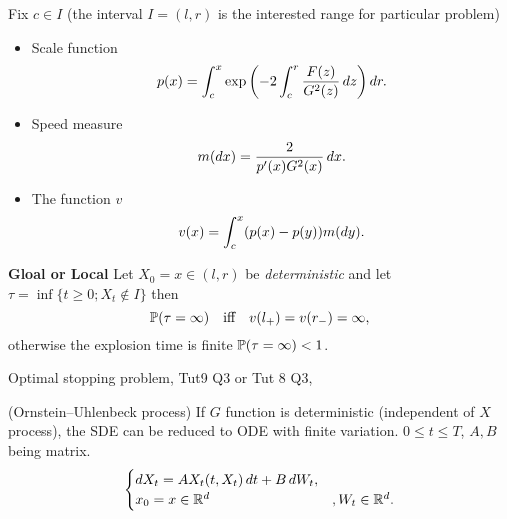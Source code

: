 \noindent Fix $c\in I$ (the interval $I = (l, r)$ is the interested range for particular problem)
\begin{itemize}
    \item Scale function
        \begin{equation*}
            p(x) = \int_c^x \exp\left(-2 \int_c^r \frac{F(z)}{G^2(z)} \mathop{}\!d z \right) \mathop{}\!d r.
        \end{equation*}
    \item Speed measure
        \begin{equation*}
            m(\mathop{}\!d x) = \frac{2}{p'(x) G^2(x)} \mathop{}\!d x.
        \end{equation*}
    \item The function $v$
        \begin{equation*}
            v(x) = \int_c^x (p(x)- p(y)) m(\mathop{}\!d y).
        \end{equation*}
\end{itemize}

\noindent \textbf{Gloal or Local}
Let $X_0 = x \in (l ,r)$ be \textit{deterministic} and let $\tau = \inf\{t\geq 0; X_t \notin I\}$ then \begin{equation*}
    \mathbb{P}(\tau = \infty) \quad \text{iff} \quad v (l_+) = v(r_-) = \infty,
\end{equation*} otherwise the explosion time is finite $\mathbb{P}(\tau = \infty) < 1$.

\newpage 
Optimal stopping problem, Tut9 Q3 or Tut 8 Q3, 



(Ornstein–Uhlenbeck process)
If $G$ function is deterministic (independent of $X$ process), the SDE can be reduced to ODE with finite variation. $0\leq t\leq T$, $A,B$ being matrix.
\begin{equation*}
    \begin{cases}
    \mathop{}\!d X_t = A X_t(t,X_t) \mathop{}\!d t + B \mathop{}\!d W_t,\\
    x_0= x \in \mathbb{R}^d &, W_t\in \mathbb{R}^d.
    \end{cases}
\end{equation*}

